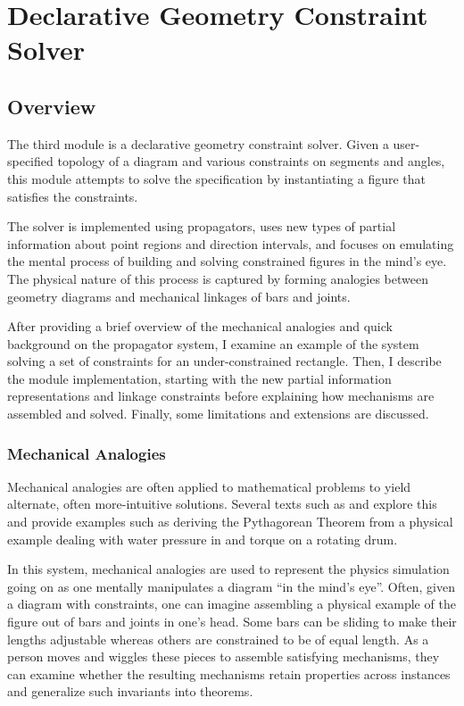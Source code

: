 \chapter{Declarative Geometry Constraint Solver}
\label{chap:declarative}

\section{Overview}

The third module is a declarative geometry constraint solver. Given a
user-specified topology of a diagram and various constraints on
segments and angles, this module attempts to solve the specification
by instantiating a figure that satisfies the constraints.

The solver is implemented using propagators, uses new types of partial
information about point regions and direction intervals, and focuses
on emulating the mental process of building and solving constrained
figures in the mind's eye. The physical nature of this process is
captured by forming analogies between geometry diagrams and mechanical
linkages of bars and joints.

After providing a brief overview of the mechanical analogies and quick
background on the propagator system, I examine an example of the
system solving a set of constraints for an under-constrained
rectangle. Then, I describe the module implementation, starting with
the new partial information representations and linkage constraints
before explaining how mechanisms are assembled and solved. Finally,
some limitations and extensions are discussed.


\subsection{Mechanical Analogies}

Mechanical analogies are often applied to mathematical problems to
yield alternate, often more-intuitive solutions. Several texts such as
\cite{levi2009mathematical} and \cite{uspenskii1961some} explore this
and provide examples such as deriving the Pythagorean Theorem from a
physical example dealing with water pressure in and torque on a
rotating drum.

In this system, mechanical analogies are used to represent the physics
simulation going on as one mentally manipulates a diagram ``in the
mind's eye''. Often, given a diagram with constraints, one can imagine
assembling a physical example of the figure out of bars and joints in
one's head.  Some bars can be sliding to make their lengths adjustable
whereas others are constrained to be of equal length.  As a person
moves and wiggles these pieces to assemble satisfying mechanisms, they
can examine whether the resulting mechanisms retain properties across
instances and generalize such invariants into theorems.


